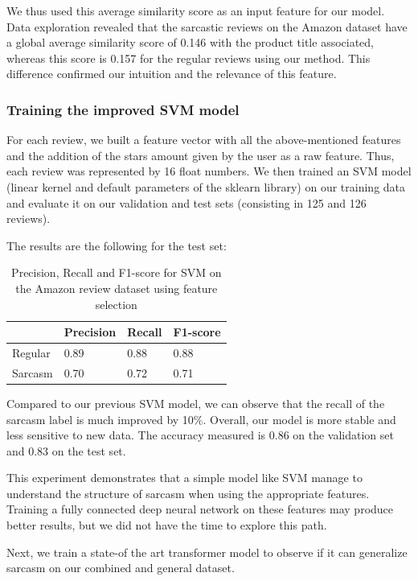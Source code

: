 \documentclass[10pt,twocolumn,letterpaper]{article}
\begin{document}
We thus used this average similarity score as an input feature for our model.
Data exploration revealed that the sarcastic reviews on the Amazon dataset have a global average similarity score of 0.146 with the product title associated, whereas this score is 0.157 for the regular reviews using our method.
This difference confirmed our intuition and the relevance of this feature.

\subsubsection{Training the improved SVM model}

For each review, we built a feature vector with all the above-mentioned features and the addition of the stars amount given by the user as a raw feature.
Thus, each review was represented by 16 float numbers.
We then trained an SVM model (linear kernel and default parameters of the sklearn library) on our training data and evaluate it on our validation and test sets (consisting in 125 and 126 reviews).

The results are the following for the test set:

\begin{table}[H]
    \centering
    \begin{tabularx}{\linewidth}{|X|X|X|X|}
        \hline
        & Precision & Recall & F1-score \\
        \hline
        Regular & 0.89 & 0.88 & 0.88 \\
        \hline
        Sarcasm & 0.70 & 0.72 & 0.71 \\
        \hline
    \end{tabularx}
    \caption{Precision, Recall and F1-score for SVM on the Amazon review dataset using feature selection}
\end{table}

Compared to our previous SVM model, we can observe that the recall of the sarcasm label is much improved by 10\%.
Overall, our model is more stable and less sensitive to new data.
The accuracy measured is 0.86 on the validation set and 0.83 on the test set.

This experiment demonstrates that a simple model like SVM manage to understand the structure of sarcasm when using the appropriate features.
Training a fully connected deep neural network on these features may produce better results, but we did not have the time to explore this path.

Next, we train a state-of the art transformer model to observe if it can generalize sarcasm on our combined and general dataset.
\end{document}
